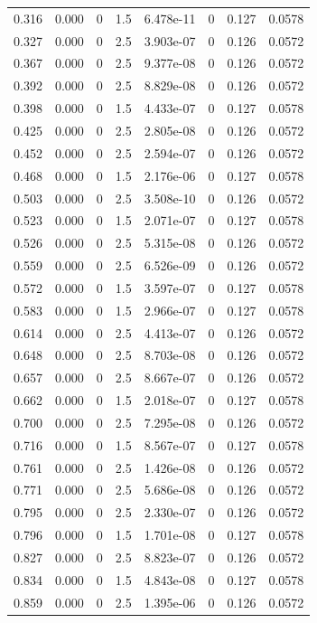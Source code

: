 \documentclass[preview]{standalone}
\begin{document}
{{\begin{tabular}{L{1.2cm}C{1.2cm} C{0.3cm}C{0.5cm} C{1.4cm}C{1.4cm} C{1.4cm}C{1.4cm}}
  0.316  &  0.000  & 0     & 1.5 &  6.478e-11  & 0  & 0.127 &  0.0578   \\ 
  0.327  &  0.000  & 0     & 2.5 &  3.903e-07  & 0  & 0.126 &  0.0572   \\ 
  0.367  &  0.000  & 0     & 2.5 &  9.377e-08  & 0  & 0.126 &  0.0572   \\ 
  0.392  &  0.000  & 0     & 2.5 &  8.829e-08  & 0  & 0.126 &  0.0572   \\ 
  0.398  &  0.000  & 0     & 1.5 &  4.433e-07  & 0  & 0.127 &  0.0578   \\ 
  0.425  &  0.000  & 0     & 2.5 &  2.805e-08  & 0  & 0.126 &  0.0572   \\ 
  0.452  &  0.000  & 0     & 2.5 &  2.594e-07  & 0  & 0.126 &  0.0572   \\ 
  0.468  &  0.000  & 0     & 1.5 &  2.176e-06  & 0  & 0.127 &  0.0578   \\ 
  0.503  &  0.000  & 0     & 2.5 &  3.508e-10  & 0  & 0.126 &  0.0572   \\ 
  0.523  &  0.000  & 0     & 1.5 &  2.071e-07  & 0  & 0.127 &  0.0578   \\ 
  0.526  &  0.000  & 0     & 2.5 &  5.315e-08  & 0  & 0.126 &  0.0572   \\ 
  0.559  &  0.000  & 0     & 2.5 &  6.526e-09  & 0  & 0.126 &  0.0572   \\ 
  0.572  &  0.000  & 0     & 1.5 &  3.597e-07  & 0  & 0.127 &  0.0578   \\ 
  0.583  &  0.000  & 0     & 1.5 &  2.966e-07  & 0  & 0.127 &  0.0578   \\ 
  0.614  &  0.000  & 0     & 2.5 &  4.413e-07  & 0  & 0.126 &  0.0572   \\ 
  0.648  &  0.000  & 0     & 2.5 &  8.703e-08  & 0  & 0.126 &  0.0572   \\ 
  0.657  &  0.000  & 0     & 2.5 &  8.667e-07  & 0  & 0.126 &  0.0572   \\ 
  0.662  &  0.000  & 0     & 1.5 &  2.018e-07  & 0  & 0.127 &  0.0578   \\ 
  0.700  &  0.000  & 0     & 2.5 &  7.295e-08  & 0  & 0.126 &  0.0572   \\ 
  0.716  &  0.000  & 0     & 1.5 &  8.567e-07  & 0  & 0.127 &  0.0578   \\ 
  0.761  &  0.000  & 0     & 2.5 &  1.426e-08  & 0  & 0.126 &  0.0572   \\ 
  0.771  &  0.000  & 0     & 2.5 &  5.686e-08  & 0  & 0.126 &  0.0572   \\ 
  0.795  &  0.000  & 0     & 2.5 &  2.330e-07  & 0  & 0.126 &  0.0572   \\ 
  0.796  &  0.000  & 0     & 1.5 &  1.701e-08  & 0  & 0.127 &  0.0578   \\ 
  0.827  &  0.000  & 0     & 2.5 &  8.823e-07  & 0  & 0.126 &  0.0572   \\ 
  0.834  &  0.000  & 0     & 1.5 &  4.843e-08  & 0  & 0.127 &  0.0578   \\ 
  0.859  &  0.000  & 0     & 2.5 &  1.395e-06  & 0  & 0.126 &  0.0572   \\ 
\hline 
\end{tabular} 

}}
\end{document}
